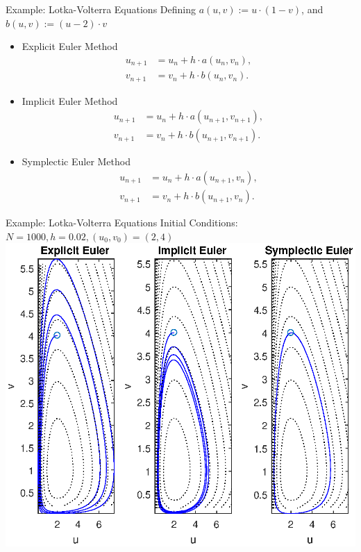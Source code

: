 \documentclass{beamer}
\begin{document}
\begin{frame}{Example: Lotka-Volterra Equations}
Defining $a(u, v) := u\cdot(1-v)$, and $b(u, v) := (u-2)\cdot v$
\vfill
	\begin{itemize}
		\item Explicit Euler Method
			\begin{align*}
				u_{n+1} &= u_{n} + h\cdot a(u_{n}, v_{n}), \\
				v_{n+1} &= v_{n} + h\cdot b(u_{n}, v_{n}).
			\end{align*}
		\item Implicit Euler Method
			\begin{align*}
				u_{n+1} &= u_{n} + h\cdot a(u_{n+1}, v_{n+1}), \\
				v_{n+1} &= v_{n} + h\cdot b(u_{n+1}, v_{n+1}).
			\end{align*}
		\item Symplectic Euler Method
			\begin{align*}
				u_{n+1} &= u_{n} + h\cdot a(u_{n+1}, v_{n}), \\
				v_{n+1} &= v_{n} + h\cdot b(u_{n+1}, v_{n}).
			\end{align*}
	\end{itemize}
\end{frame}

\begin{frame}{Example: Lotka-Volterra Equations}
Initial Conditions: $N = 1000, h = 0.02, (u_{0}, v_{0}) = (2, 4)$
\centering
\includegraphics[scale=0.63]{lotka-volterra_method_comparison}
\end{frame}
\end{document}
